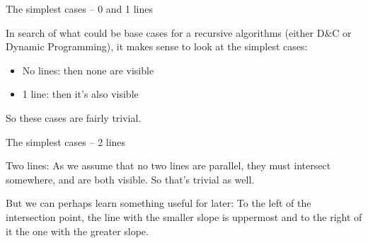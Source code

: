 \documentclass[ignorenonframetext,]{beamer}
\begin{document}
\begin{frame}{The simplest cases -- 0 and 1 lines}

In search of what could be base cases for a recursive algorithms
(either D\&C or Dynamic Programming), it makes sense to look at the
simplest cases:

\begin{itemize}
\item No lines: then none are visible
\item 1 line: then it's also visible
\end{itemize}
So these cases are fairly trivial.
\end{frame}

\begin{frame}{The simplest cases -- 2 lines}

Two lines: As we assume that no two lines are parallel, they must
intersect somewhere, and are both visible. So that's trivial as well.


But we can perhaps learn something useful for later: To the left of
the intersection point, the line with the smaller slope is uppermost
and to the right of it the one with the greater slope.
\end{frame}
\end{document}
